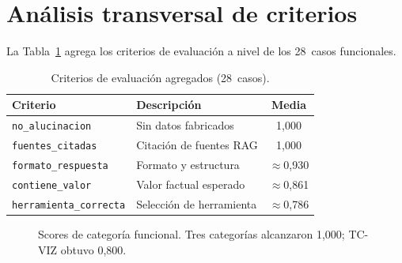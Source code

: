 \section{Análisis transversal de criterios}

La Tabla~\ref{tab:res_criterios} agrega los criterios de evaluación a nivel de los 28~casos funcionales.

\begin{table}[H]
\centering
\caption{Criterios de evaluación agregados (28~casos).}
\label{tab:res_criterios}
\footnotesize
\begin{tabularx}{\columnwidth}{lXc}
\toprule
\textbf{Criterio} & \textbf{Descripción} & \textbf{Media} \\
\midrule
\texttt{no\_alucinacion}       & Sin datos fabricados       & 1,000 \\
\texttt{fuentes\_citadas}      & Citación de fuentes \ac{RAG}    & 1,000 \\
\texttt{formato\_respuesta}    & Formato y estructura       & $\approx$0,930 \\
\texttt{contiene\_valor}       & Valor factual esperado     & $\approx$0,861 \\
\texttt{herramienta\_correcta} & Selección de herramienta   & $\approx$0,786 \\
\bottomrule
\end{tabularx}
\end{table}

\begin{figure}[H]
\centering
{}
\caption{Scores de categoría funcional. Tres categorías alcanzaron 1,000; TC-VIZ obtuvo 0,800.}
\label{fig:res_funcional_barras}
\end{figure}


